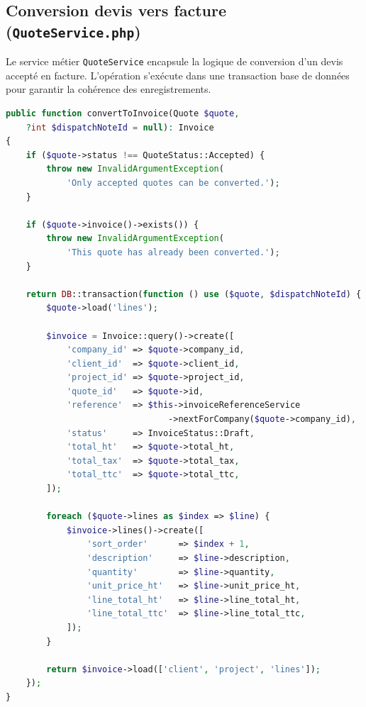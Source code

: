 \subsection{Conversion devis vers facture (\texttt{QuoteService.php})}

Le service métier \texttt{QuoteService} encapsule la logique de conversion d'un
devis accepté en facture. L'opération s'exécute dans une transaction base de
données pour garantir la cohérence des enregistrements.

\begin{lstlisting}[language=PHP,
  caption={QuoteService.php : conversion devis $\rightarrow$ facture (extrait)}]
public function convertToInvoice(Quote $quote,
    ?int $dispatchNoteId = null): Invoice
{
    if ($quote->status !== QuoteStatus::Accepted) {
        throw new InvalidArgumentException(
            'Only accepted quotes can be converted.');
    }

    if ($quote->invoice()->exists()) {
        throw new InvalidArgumentException(
            'This quote has already been converted.');
    }

    return DB::transaction(function () use ($quote, $dispatchNoteId) {
        $quote->load('lines');

        $invoice = Invoice::query()->create([
            'company_id' => $quote->company_id,
            'client_id'  => $quote->client_id,
            'project_id' => $quote->project_id,
            'quote_id'   => $quote->id,
            'reference'  => $this->invoiceReferenceService
                                ->nextForCompany($quote->company_id),
            'status'     => InvoiceStatus::Draft,
            'total_ht'   => $quote->total_ht,
            'total_tax'  => $quote->total_tax,
            'total_ttc'  => $quote->total_ttc,
        ]);

        foreach ($quote->lines as $index => $line) {
            $invoice->lines()->create([
                'sort_order'      => $index + 1,
                'description'     => $line->description,
                'quantity'        => $line->quantity,
                'unit_price_ht'   => $line->unit_price_ht,
                'line_total_ht'   => $line->line_total_ht,
                'line_total_ttc'  => $line->line_total_ttc,
            ]);
        }

        return $invoice->load(['client', 'project', 'lines']);
    });
}
\end{lstlisting}

